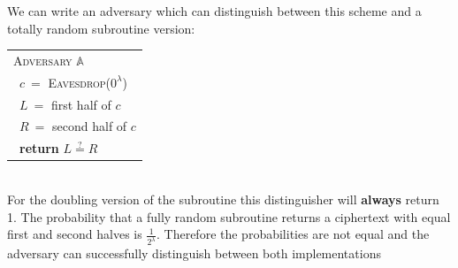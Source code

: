 \documentclass{article}
\begin{document}
\begin{adjustwidth}{2em}{}
\begin{adjustwidth}{2em}{4em}
\begin{adjustwidth}{2em}{}
\begin{adjustwidth}{2em}{}
						We can write an adversary which can distinguish between this scheme and a totally random subroutine version:
						\begin{center}
							\begin{tabular}{|l|}
								\hline
								\cellcolor{gray!80} \textsc{Adversary} $\mathbb{A}$ \\
								\ $c \ =$ \textsc{Eavesdrop}($0^{\lambda}$) \\
								\ $L \ =$ first half of $c$ \\
								\ $R \ =$ second half of $c$ \\
								\ \textbf{return} $L \stackrel{?}{=} R$	\\										\hline
							\end{tabular}
						\end{center}
						\hfill \\
						For the doubling version of the subroutine this distinguisher will \textbf{always} return 1. The probability that a fully random subroutine returns a ciphertext with equal first and second halves is $\frac{1}{2^{\lambda}}$. Therefore the probabilities are not equal and the adversary can successfully distinguish between both implementations
					\end{adjustwidth}
				\end{adjustwidth}

\end{adjustwidth}
\end{adjustwidth}
\end{document}
